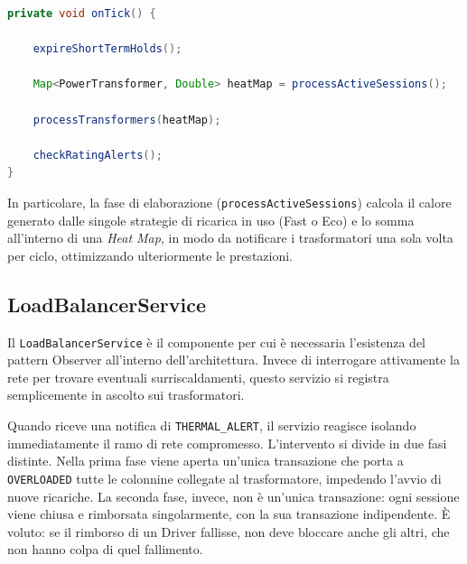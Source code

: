 \vspace{0.2cm}
\noindent\begin{minipage}{\linewidth}
\begin{lstlisting}[language=Java]
private void onTick() {
    
    expireShortTermHolds();

    Map<PowerTransformer, Double> heatMap = processActiveSessions();

    processTransformers(heatMap);

    checkRatingAlerts();
}
\end{lstlisting}
\end{minipage}
\vspace{0.3cm}

In particolare, la fase di elaborazione (\texttt{processActiveSessions}) calcola il calore generato dalle singole strategie di ricarica in uso (Fast o Eco) e lo somma all'interno di una \textit{Heat Map}, in modo da notificare i trasformatori una sola volta per ciclo, ottimizzando ulteriormente le prestazioni.

\subsection{LoadBalancerService}
\label{subsec:loadbalancer}
Il \texttt{LoadBalancerService} è il componente per cui è necessaria l'esistenza del pattern Observer all'interno dell'architettura. Invece di interrogare attivamente la rete per trovare eventuali surriscaldamenti, questo servizio si registra semplicemente in ascolto sui trasformatori. 

Quando riceve una notifica di \texttt{THERMAL\_ALERT}, il servizio reagisce isolando immediatamente il ramo di rete compromesso. L'intervento si divide in due fasi distinte. Nella prima fase viene aperta un'unica transazione che porta a \texttt{OVERLOADED} tutte le colonnine collegate al trasformatore, impedendo l'avvio di nuove ricariche. La seconda fase, invece, non è un'unica transazione: ogni sessione viene chiusa e rimborsata singolarmente, con la sua transazione indipendente. È voluto: se il rimborso di un Driver fallisse, non deve bloccare anche gli altri, che non hanno colpa di quel fallimento.

